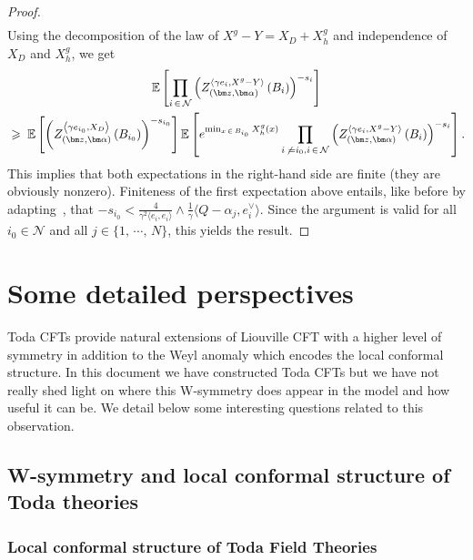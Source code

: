 \documentclass[AHL,Unicode,longabstracts,published]{cedram}
\renewcommand{\geq}{\;\geqslant\;}
\newcommand{\clN}{\mathcal{N}}
\newcommand{\E}{\mathbb{E}}
\newcommand{\ps}[1]{\langle #1 \rangle}
\begin{document}
\begin{proof}
\begin{align*}
\end{align*}
Using the decomposition of the law of $X^g-Y=X_D+X^g_h$ and independence of $X_D$ and $X^g_h$, we get
\begin{multline*}
\E \left[\prod_{i\,\in\,\clN} \left(Z_{\left(\bm z,\bm \alpha\right)}^{\left\langle\gamma e_i,X^g-Y\right\rangle} \left(B_i\right)\right)^{- s_i} \right]\\
\geq \E \left[\left(Z_{\left(\bm z,\bm \alpha\right)}^{\left\langle\gamma e_{i_0},X_D\right\rangle} \left(B_{i_0}\right)\right)^{- s_{i_0}} \right] \E \left[e^{\min_{x\,\in\, B_{i_0}}X^g_h(x)} \prod_{i\,\not\,=i_0,i\,\in\, \clN} \left(Z_{\left(\bm z,\bm \alpha\right)}^{\left\langle\gamma e_i,X^g-Y\right\rangle} \left(B_i\right)\right)^{- s_i} \right].
\end{multline*}
This implies that both expectations in the right-hand side are finite (they are obviously nonzero). Finiteness of the first expectation above entails, like before by adapting~\cite[Lemma~A.1]{DKRV}, that $-s_{i_0}<\frac{4}{\gamma^2\ps{e_i,e_i}}\wedge \frac{1}{\gamma}\langle Q-\alpha_j,e_i^\vee\rangle$. Since the argument is valid for all $i_0\in\clN$ and all $j\in\{1,\,\cdots,\,N\}$, this yields the result.
\end{proof}


\section{Some detailed perspectives}
Toda CFTs provide natural extensions of Liouville CFT with a higher level of symmetry in addition to the Weyl anomaly which encodes the local conformal structure. In this document we have constructed Toda CFTs but we have not really shed light on where this W-symmetry does appear in the model and how useful it can be. We detail below some interesting questions related to this observation.
\subsection{W-symmetry and local conformal structure of Toda theories}\label{sec:sym}
\subsubsection{Local conformal structure of Toda Field Theories}
\end{document}
